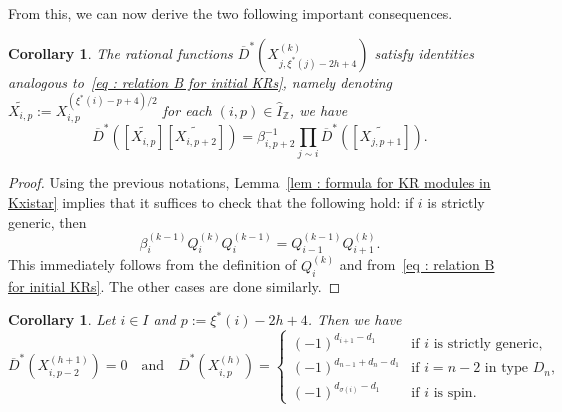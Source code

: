 \documentclass[12pt]{amsart}
\theoremstyle{plain}
\newtheorem{corollary}[theorem]{Corollary}
\theoremstyle{definition}
\numberwithin{equation}{section}
\newcommand{\IZ}{\widehat{I}_{\mathbb{Z}}}
\newcommand{\barDstar}{\overline{D}^{*}}
\newcommand{\xistar}{\xi^{*}}
\begin{document}
 From this, we can now derive the two following important consequences. 

  \begin{corollary} \label{cor : relation B for non initial KRs}
      The rational functions $\barDstar \left( X_{j, \xistar(j)-2h+4}^{(k)} \right)$ satisfy identities analogous to~\eqref{eq : relation B for initial KRs}, namely denoting $\widetilde{X_{i,p}} := X_{i,p}^{(\xistar(i)-p+4)/2}$ for each $(i,p) \in \IZ$, we have 
      $$  \barDstar \left( [\widetilde{X_{i,p}}] [\widetilde{X_{i,p+2}}] \right) =  \beta_{i,p+2}^{-1} \prod_{j \sim i} \barDstar \left( [\widetilde{X_{j,p+1}}] \right) .  $$
  \end{corollary}

   \begin{proof}
     Using the previous notations, Lemma~\ref{lem : formula for KR modules in Kxistar} implies that it suffices to check that the following hold: if $i$ is  strictly generic, then 
       $$ \beta_i^{(k-1)} Q_i^{(k)} Q_i^{(k-1)}  = Q_{i-1}^{(k-1)} Q_{i+1}^{(k)}.  $$
       This immediately follows from the definition of $Q_i^{(k)}$ and from~\eqref{eq : relation B for initial KRs}. The other cases are done similarly.
   \end{proof}

  \begin{corollary} \label{cor : vanishing property}
  Let $i \in I$ and $p := \xi^{*}(i)-2h+4$. Then we have 
 $$ \barDstar \left( X_{i,p-2}^{(h+1)} \right)= 0  \quad  \text{and} \quad 
 \barDstar \left( X_{i,p}^{(h)} \right)  = 
  \begin{cases}
      (-1)^{d_{i+1}-d_1} & \text{if $i$ is strictly generic,} \\
      (-1)^{d_{n-1}+d_n-d_1} & \text{if $i=n-2$ in type $D_n$,} \\
      (-1)^{d_{\sigma(i)}-d_1} & \text{if $i$ is spin.}
      \end{cases}$$     
  \end{corollary}
\end{document}
